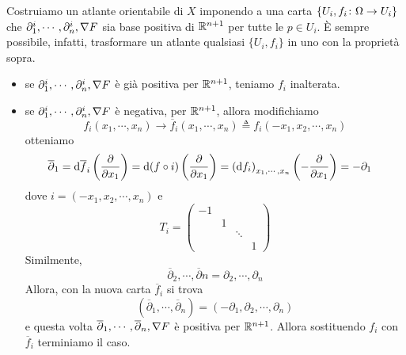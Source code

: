 \documentclass[a4paper]{article}
\begin{document}
\begin{snippetproof}{}
    Costruiamo un atlante orientabile di \(X\)
    imponendo a una carta \(\{U_i, f_i\colon \Omega \to U_i\}\)
    che \(\partial_1^i, \cdots, \partial_n^i, \nabla F\)
    sia base positiva di \(\mathbb{R}^{n+1}\)
    per tutte le \(p \in U_i\).
    È sempre possibile, infatti, trasformare un atlante qualsiasi
    \(\{U_i, f_i\}\)
    in uno con la proprietà sopra.
    \begin{itemize}
        \item se \(\partial_1^i, \cdots, \partial_n^i, \nabla F\)
        è già positiva per \(\mathbb{R}^{n+1}\),
        teniamo \(f_i\) inalterata.
        \item se \(\partial_1^i, \cdots, \partial_n^i, \nabla F\)
        è negativa, per \(\mathbb{R}^{n+1}\),
        allora modifichiamo \[
            f_i(x_1, \cdots, x_n)
            \to
            \overline f_i(x_1, \cdots, x_n)
            \triangleq f_i(-x_1, x_2, \cdots, x_n)
        \]
        otteniamo 
        \begin{align*}
            \overline \partial_1
            &= \text d\overline f_i\left(
                \frac{\partial}{\partial x_1}
            \right)
            = \text d(f \circ i) \left(
                \frac{\partial}{\partial x_1}
            \right)
            = \left(
                \text df_i
            \right)_{x_1, \cdots, x_n}\left(
                -\frac{\partial}{\partial x_1}
            \right) = -\partial_1
        \end{align*}
        dove \(i = (-x_1, x_2, \cdots, x_n)\)
         e \[
            T_i = \begin{pmatrix}
                -1 & & &  \\
                & 1 & & \\
                & & \ddots & \\
                & & & 1
            \end{pmatrix}
         \]
         Similmente, \[
             \overline \partial_2, \cdots, \overline \partial n =
             \partial_2, \cdots, \partial_n
         \]
         Allora, con la nuova carta \(\overline f_i\)
         si trova \[
             (\overline \partial_1,
             \cdots, \overline \partial_n)
             = (-\partial_1, \partial_2, \cdots, \partial_n)
         \]
         e questa volta \(\overline \partial_1, \cdots, \overline \partial_n, \nabla F\)
         è positiva per \(\mathbb{R}^{n+1}\).
         Allora sostituendo \(f_i\) con \(\overline f_i\) terminiamo il caso.

\end{itemize}
\end{snippetproof}
\end{document}
